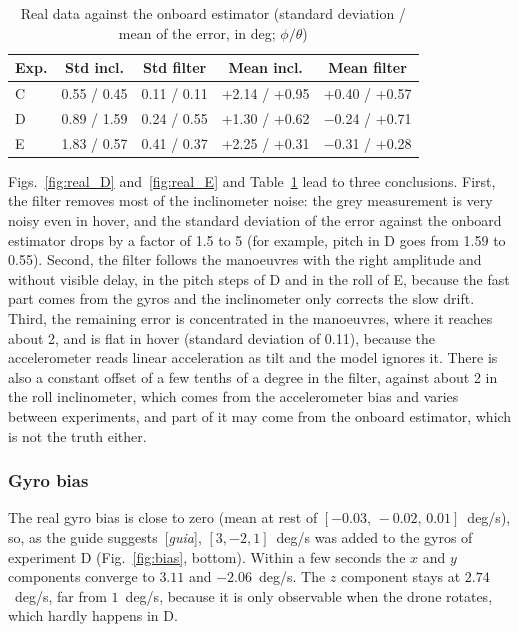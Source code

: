 \documentclass[11pt]{article}
\renewcommand{\cite}[1]{[\textit{#1}]}
\begin{document}
\begin{table}[htbp]
\caption{Real data against the onboard estimator (standard deviation / mean of the error, in deg; $\phi/\theta$)}
\label{tab:real}
\centering
\begin{tabular}{lcccc}
\hline
Exp. & Std incl. & Std filter & Mean incl. & Mean filter \\
\hline
C & 0.55 / 0.45 & 0.11 / 0.11 & +2.14 / +0.95 & +0.40 / +0.57 \\
D & 0.89 / 1.59 & 0.24 / 0.55 & +1.30 / +0.62 & $-$0.24 / +0.71 \\
E & 1.83 / 0.57 & 0.41 / 0.37 & +2.25 / +0.31 & $-$0.31 / +0.28 \\
\hline
\end{tabular}
\end{table}

Figs.~\ref{fig:real_D} and~\ref{fig:real_E} and Table~\ref{tab:real} lead to three conclusions.
First, the filter removes most of the inclinometer noise: the grey measurement is very noisy even in hover, and the standard deviation of the error against the onboard estimator drops by a factor of 1.5 to 5 (for example, pitch in D goes from 1.59\textdegree{} to 0.55\textdegree).
Second, the filter follows the manoeuvres with the right amplitude and without visible delay, in the pitch steps of D and in the roll of E, because the fast part comes from the gyros and the inclinometer only corrects the slow drift.
Third, the remaining error is concentrated in the manoeuvres, where it reaches about 2\textdegree, and is flat in hover (standard deviation of 0.11\textdegree), because the accelerometer reads linear acceleration as tilt and the model ignores it.
There is also a constant offset of a few tenths of a degree in the filter, against about 2\textdegree{} in the roll inclinometer, which comes from the accelerometer bias and varies between experiments, and part of it may come from the onboard estimator, which is not the truth either.

\subsubsection{Gyro bias}

The real gyro bias is close to zero (mean at rest of $[-0.03,\,-0.02,\,0.01]$~deg/s), so, as the guide suggests~\cite{guia}, $[3,-2,1]$~deg/s was added to the gyros of experiment D (Fig.~\ref{fig:bias}, bottom).
Within a few seconds the $x$ and $y$ components converge to $3.11$ and $-2.06$~deg/s.
The $z$ component stays at $2.74$~deg/s, far from $1$~deg/s, because it is only observable when the drone rotates, which hardly happens in D.
\end{document}
